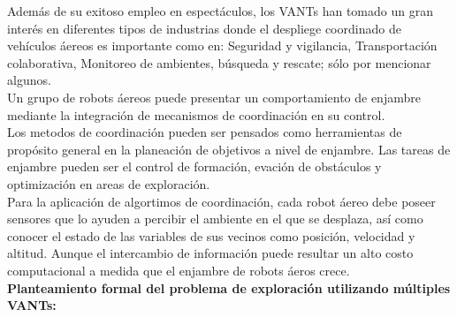 \documentclass{article}
\begin{document}




Además de su exitoso empleo en espectáculos, los VANTs han tomado un gran interés en diferentes tipos de industrias donde el despliege coordinado de vehículos áereos es importante como en: Seguridad y vigilancia, Transportación colaborativa, Monitoreo de ambientes, búsqueda y rescate; sólo por mencionar algunos.\\

Un grupo de robots áereos puede presentar un comportamiento de enjambre mediante la integración de mecanismos de coordinación en su control.\\

Los metodos de coordinación pueden ser pensados como herramientas de propósito general en la planeación de objetivos a nivel de enjambre. Las tareas de enjambre pueden ser el control de formación, evación de obstáculos y optimización en areas de exploración.\\

Para la aplicación de algortimos de coordinación, cada robot áereo debe poseer sensores que lo ayuden a percibir el ambiente en el que se desplaza, así como conocer el estado de las variables de sus vecinos como posición, velocidad y altitud. Aunque el intercambio de información puede resultar un alto costo computacional a medida que el enjambre de robots áeros crece.\\

\textbf{Planteamiento formal del problema de exploración utilizando múltiples VANTs:}\\
\end{document}
